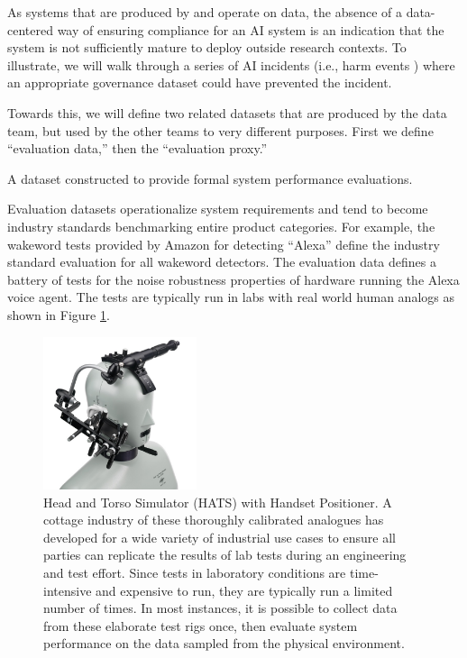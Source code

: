 As systems that are produced by and operate on data, the absence of a data-centered way of ensuring compliance for an AI system is an indication that the system is not sufficiently mature to deploy outside research contexts. To illustrate, we will walk through a series of AI incidents (i.e., harm events \cite{mcgregor_indexing_2022}) where an appropriate governance dataset could have prevented the incident.

Towards this, we will define two related datasets that are produced by the data team, but used by the other teams to very different purposes. First we define ``evaluation data,'' then the ``evaluation proxy.''

\begin{definition}
    A dataset constructed to provide formal system performance evaluations.
\end{definition}

Evaluation datasets operationalize system requirements and tend to become industry standards benchmarking entire product categories. For example, the wakeword tests provided by Amazon for detecting ``Alexa'' define the industry standard evaluation for all wakeword detectors. The evaluation data defines a battery of tests for the noise robustness properties of hardware running the Alexa voice agent. The tests are typically run in labs with real world human analogs as shown in Figure \ref{fig:hats}.

\begin{figure}[ht]
    \centering
    \includegraphics[width=0.4\textwidth]{images/HATS_Type4128-D_600x600.jpg}
    \caption{Head and Torso Simulator (HATS) with Handset Positioner. A cottage industry of these thoroughly calibrated analogues has developed for a wide variety of industrial use cases to ensure all parties can replicate the results of lab tests during an engineering and test effort. Since tests in laboratory conditions are time-intensive and expensive to run, they are typically run a limited number of times. In most instances, it is possible to collect data from these elaborate test rigs once, then evaluate system performance on the data sampled from the physical environment.}
    \label{fig:hats}
\end{figure}

